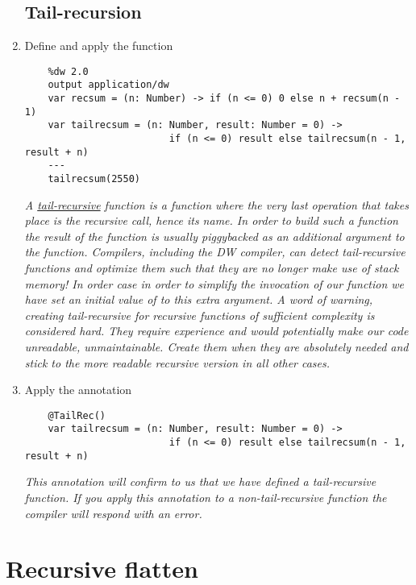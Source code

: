 \begin{enumerate}[resume*]
\subsection{Tail-recursion}

\item Define and apply the  function
  \begin{verbatim}
    %dw 2.0
    output application/dw
    var recsum = (n: Number) -> if (n <= 0) 0 else n + recsum(n - 1)
    var tailrecsum = (n: Number, result: Number = 0) -> 
                         if (n <= 0) result else tailrecsum(n - 1, result + n)
    ---
    tailrecsum(2550)
  \end{verbatim}
  \emph{
    A \href{https://en.wikipedia.org/wiki/Tail_call}{tail-recursive} function is a function where the very last operation that takes place is the recursive call, hence its name.  In order to build such a function the result of the function is usually piggybacked as an additional argument to the function. Compilers, including the DW compiler, can detect tail-recursive functions and optimize them such that they are no longer make use of stack memory!
    \newline
    In order case in order to simplify the invocation of our function we have set an initial value of  to this extra argument.
    \newline
    A word of warning, creating tail-recursive for recursive functions of sufficient complexity is considered hard.  They require experience and would potentially make our code unreadable, unmaintainable.  Create them when they are absolutely needed and stick to the more readable recursive version in all other cases.  
  }
\item Apply the  annotation
  \begin{verbatim}
    @TailRec()
    var tailrecsum = (n: Number, result: Number = 0) -> 
                         if (n <= 0) result else tailrecsum(n - 1, result + n)
  \end{verbatim}
  \emph{
    This annotation will confirm to us that we have defined a tail-recursive function.  If you apply this annotation to a non-tail-recursive function the compiler will respond with an error.
  }
\end{enumerate}


\section{Recursive flatten}

